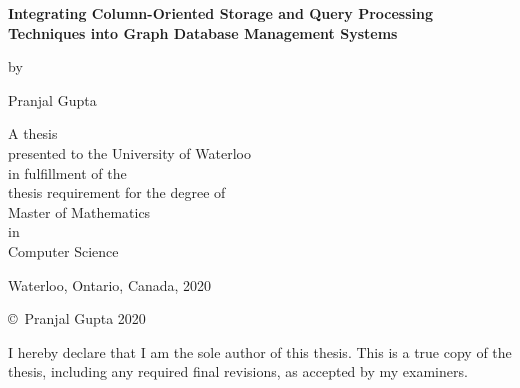 
\pagestyle{empty}

\begin{titlepage}
        \begin{center}
        \vspace*{0.2cm}

        \Huge
        {\bf Integrating Column-Oriented Storage and Query
        	Processing Techniques into Graph Database
        	Management Systems }

        \vspace*{1.0cm}

        \normalsize
        by \\

        \vspace*{1.0cm}

        \Large
        Pranjal Gupta \\

        \vspace*{3.0cm}

        \normalsize
        A thesis \\
        presented to the University of Waterloo \\ 
        in fulfillment of the \\
        thesis requirement for the degree of \\
        Master of Mathematics \\
        in \\
        Computer Science \\

        \vspace*{2.0cm}

        Waterloo, Ontario, Canada, 2020 \\

        \vspace*{1.0cm}

        \copyright\ Pranjal Gupta 2020 \\
        \end{center}
\end{titlepage}

\pagestyle{plain}
\setcounter{page}{2}

\cleardoublepage

\cleardoublepage


\noindent
I hereby declare that I am the sole author of this thesis. This is a true copy of the thesis, including any required final revisions, as accepted by my examiners.

